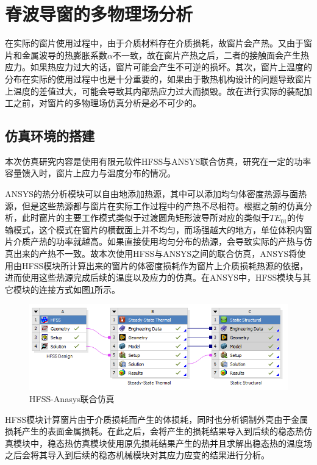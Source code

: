\documentclass[master]{thesis-uestc}
\begin{document}
\section{脊波导窗的多物理场分析}
在实际的窗片使用过程中，由于介质材料存在介质损耗，故窗片会产热。又由于窗片和金属波导的热膨胀系数\(\alpha\)不一致，故在窗片产热之后，二者的接触面会产生热应力。如果热应力过大的话，窗片可能会产生不可逆的损坏。其次，窗片上温度的分布在实际的使用过程中也是十分重要的，如果由于散热机构设计的问题导致窗片上温度的差值过大，可能会导致其内部热应力过大而损毁。故在进行实际的装配加工之前，对窗片的多物理场仿真分析是必不可少的。
\subsection{仿真环境的搭建}
本次仿真研究内容是使用有限元软件HFSS与ANSYS联合仿真，研究在一定的功率容量馈入时，窗片上应力与温度分布的情况。

ANSYS的热分析模块可以自由地添加热源，其中可以添加均匀体密度热源与面热源，但是这些热源都与窗片在实际工作过程中的产热不尽相符。根据之前的仿真分析，此时窗片的主要工作模式类似于过渡圆角矩形波导所对应的类似于\(TE_{01}\)的传输模式，这个模式在窗片的横截面上并不均匀，而场强越大的地方，单位体积内窗片介质产热的功率就越高。如果直接使用均匀分布的热源，会导致实际的产热与仿真出来的产热不一致。故本次使用HFSS与ANSYS之间的联合仿真，ANSYS将使用由HFSS模块所计算出来的窗片的体密度损耗作为窗片上介质损耗热源的依据，进而使用这些热源完成后续的温度以及应力的仿真。在ANSYS中，HFSS模块与其它模块的连接方式如图\ref{fig:ANSYSHFSS连接}所示。
\begin{figure}[!htb]
    \centering
    \includegraphics[width=0.5\linewidth]{pic/chapter3/HFSS-ANSYS模块组织.png}
    \caption{HFSS-Anasys联合仿真}
    \label{fig:ANSYSHFSS连接}
\end{figure}
HFSS模块计算窗片由于介质损耗而产生的体损耗，同时也分析铜制外壳由于金属损耗产生的表面金属损耗。在此之后，会将产生的损耗结果导入到后续的稳态热仿真模块中，稳态热仿真模块使用原先损耗结果产生的热并且求解出稳态热的温度场之后会将其导入到后续的稳态机械模块对其应力应变的结果进行分析。
\end{document}
